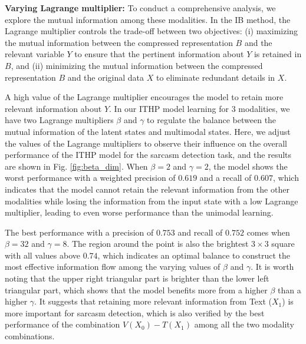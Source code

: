 \documentclass{article} %
\begin{document}
\textbf{Varying Lagrange multiplier:} To conduct a comprehensive analysis, we explore the mutual information among these modalities. In the IB method, the Lagrange multiplier controls the trade-off between two objectives: (i) maximizing the mutual information between the compressed representation $B$ and the relevant variable $Y$ to ensure that the pertinent information about $Y$ is retained in $B$, and (ii) minimizing the mutual information between the compressed representation $B$ and the original data $X$ to eliminate redundant details in $X$. 

A high value of the Lagrange multiplier encourages the model to retain more relevant information about $Y$. 
In our ITHP model learning for 3 modalities, we have two Lagrange multipliers $\beta$ and $\gamma$ to regulate the balance between the mutual information of the latent states and multimodal states. Here, we adjust the values of the Lagrange multipliers to observe their influence on the overall performance of the ITHP model for the sarcasm detection task, and the results are shown in Fig. \ref{fig:beta_dim}.
When $\beta = 2$ and $\gamma = 2$, the model shows the worst performance with a weighted precision of $0.619$ and a recall of $0.607$, which indicates that the model cannot retain the relevant information from the other modalities while losing the information from the input state with a low Lagrange multiplier, leading to even worse performance than the unimodal learning. 



The best performance with a precision of $0.753$ and recall of $0.752$ comes when $\beta = 32$ and $\gamma = 8$. The region around the point is also the brightest $3 \times 3$ square with all values above $0.74$, which indicates an optimal balance to construct the most effective information flow among the varying values of $\beta$ and $\gamma$. It is worth noting that the upper right triangular part is brighter than the lower left triangular part, which shows that the model benefits more from a higher $\beta$ than a higher $\gamma$. It suggests that retaining more relevant information from Text ($X_1$) is more important for sarcasm detection, which is also verified by the best performance of the combination $V (X_0)-T (X_1)$ among all the two modality combinations.
\end{document}
